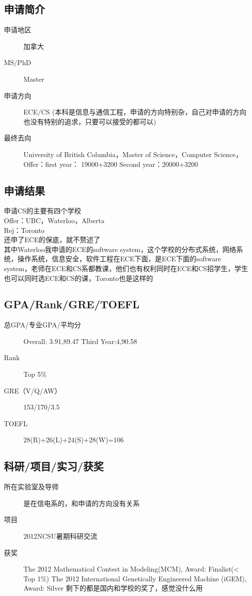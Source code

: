 \documentclass[11pt,fleqn,openany]{book} %
\begin{document}
\noindent\begin{minipage}[t]{0.45\textwidth}
\subsection*{申请简介}
\begin{description}
\item[申请地区] 加拿大
\item[MS/PhD] Master
\item[申请方向] ECE/CS (本科是信息与通信工程，申请的方向特别杂，自己对申请的方向也没有特别的追求，只要可以接受的都可以)
\item[最终去向] University of British Columbia，Master of Science，Computer Science，
Offer：first year： 19000+3200
       Second year：20000+3200
\end{description}
\end{minipage}
\hfill
\begin{minipage}[t]{0.45\textwidth}
\subsection*{申请结果}
\noindent 申请CS的主要有四个学校\\
Offer：UBC，Waterloo，Alberta\\
Rej：Toronto\\
还申了ECE的保底，就不赘述了\\
其中Waterloo我申请的ECE的software system，这个学校的分布式系统，网络系统，操作系统，信息安全，软件工程在ECE下面，是ECE下面的software system，老师在ECE和CS系都教课，他们也有权利同时在ECE和CS招学生，学生也可以同时选ECE和CS的课，Toronto也是这样的
\end{minipage}
\subsection*{GPA/Rank/GRE/TOEFL}
\begin{description}
\item[总GPA/专业GPA/平均分] Overall: 3.91,89.47 Third Year:4,90.58
\item[Rank] Top 5\%
\item[GRE（V/Q/AW）] 153/170/3.5
\item[TOEFL] 28(R)+26(L)+24(S)+28(W)=106
\end{description}

\subsection*{科研/项目/实习/获奖}
\begin{description}
\item[所在实验室及导师] 是在信电系的，和申请的方向没有关系
\item[项目] 2012NCSU暑期科研交流
\item[获奖] The 2012 Mathematical Contest in Modeling(MCM), Award: Finalist(< Top 1\%)
The 2012 International Genetically Engineered Machine (iGEM), Award: Silver
剩下的都是国内和学校的奖了，感觉没什么用
\end{description}
\end{document}
